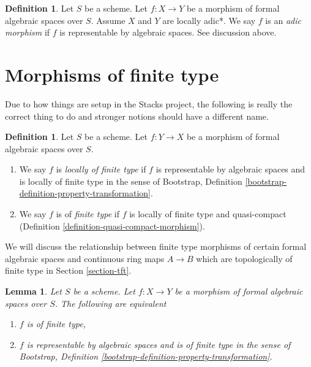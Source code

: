 \documentclass{stacks-project}
\theoremstyle{plain}
\newtheorem{lemma}[subsection]{Lemma}
\theoremstyle{definition}
\newtheorem{definition}[subsection]{Definition}
\theoremstyle{remark}
\numberwithin{equation}{subsection}
\begin{document}
\begin{definition}
\label{definition-adic-morphism}
Let $S$ be a scheme. Let $f : X \to Y$ be a morphism of formal algebraic
spaces over $S$. Assume $X$ and $Y$ are locally adic*. We say $f$ is
an {\it adic morphism} if $f$ is representable by algebraic spaces.
See discussion above.
\end{definition}











\section{Morphisms of finite type}
\label{section-finite-type}

\noindent
Due to how things are setup in the Stacks project, the following
is really the correct thing to do and stronger notions should have
a different name.

\begin{definition}
\label{definition-finite-type}
Let $S$ be a scheme. Let $f : Y \to X$ be a morphism of formal algebraic
spaces over $S$.
\begin{enumerate}
\item We say $f$ is {\it locally of finite type}
if $f$ is representable by algebraic spaces and is locally
of finite type in the sense of
Bootstrap, Definition \ref{bootstrap-definition-property-transformation}.
\item We say $f$ is of {\it finite type} if $f$ is locally of finite type and
quasi-compact (Definition \ref{definition-quasi-compact-morphism}).
\end{enumerate}
\end{definition}

\noindent
We will discuss the relationship between finite type morphisms of
certain formal algebraic spaces and
continuous ring maps $A \to B$ which are topologically of finite type
in Section \ref{section-tft}.

\begin{lemma}
\label{lemma-characterize-finite-type}
Let $S$ be a scheme. Let $f : X \to Y$ be a morphism of formal algebraic
spaces over $S$. The following are equivalent
\begin{enumerate}
\item $f$ is of finite type,
\item $f$ is representable by algebraic spaces and is of finite type in
the sense of
Bootstrap, Definition \ref{bootstrap-definition-property-transformation}.
\end{enumerate}
\end{lemma}
\end{document}
